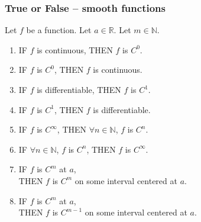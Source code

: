 \documentclass[14pt]{beamer}
\begin{document}
	\begin{frame}[t]
		\frametitle{True or False -- smooth functions}

		Let $f$ be a function. Let $a \in \mathbb{R}$. Let $m \in \mathbb{N}$.
		\vspace{.2cm}
		\begin{enumerate}
			\item IF $f$ is continuous, \; THEN $f$ is $C^{0}$.

			\item IF $f$ is $C^{0}$, \; THEN $f$ is continuous.

			\item IF $f$ is differentiable, \; THEN $f$ is $C^{1}$.

			\item IF $f$ is $C^{1}$, \; THEN $f$ is differentiable.

			\item IF $f$ is $C^{\infty}$, \; THEN $\forall n \in \mathbb{N}$, $f$ is $C
				^{n}$.

			\item IF $\forall n \in \mathbb{N}$, $f$ is $C^{n}$, \; THEN $f$ is $C^{\infty}$.

			\item IF $f$ is $C^{m}$ at $a$, \\ \; THEN $f$ is $C^{m}$ on some interval
				centered at $a$.

			\item IF $f$ is $C^{m}$ at $a$, \\ \; THEN $f$ is $C^{m-1}$ on some
				interval centered at $a$.
		\end{enumerate}
	\end{frame}
\end{document}
